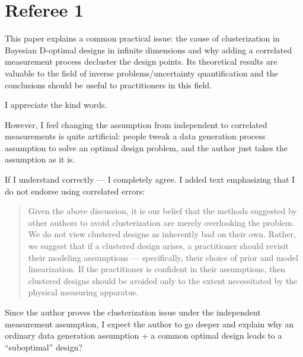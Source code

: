 \section{Referee 1}\label{ref1}
\RC This paper explains a common practical issue: the cause of
clusterization in Bayesian D-optimal designs in infinite dimensions
and why adding a correlated measurement process decluster the design
points. Its theoretical results are valuable to the field of inverse
problems/uncertainty quantification and the conclusions should be
useful to practitioners in this field.

\AR I appreciate the kind words.


\RC However, I feel changing the assumption from independent to correlated
measurements is quite artificial: people tweak a data generation
process assumption to solve an optimal design problem, and the author
just takes the assumption as it is.

\AR If I understand correctly --- I completely agree. I added text
emphasizing that I do not endorse using correlated errors:

\begin{quote} %
Given the above discussion, it is our belief that the methods
suggested by other authors to avoid clusterization are merely
overlooking the problem. We do not view clustered designs as
inherently bad on their own. Rather, we suggest that if a clustered
design arises, a practitioner should revisit their modeling
assumptions --- specifically, their choice of prior and model
linearization. If the practitioner is confident in their assumptions,
then clustered designs should be avoided only to the extent
necessitated by the physical measuring apparatus.
\end{quote}

\RC Since the author proves the clusterization issue under the independent
measurement assumption, I expect the author to go deeper and explain
why an ordinary data generation assumption + a common optimal design
leads to a “suboptimal” design?

